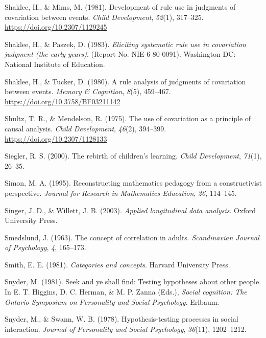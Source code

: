 \documentclass[11pt]{umnthesis}
\newlength{\cslhangindent}
\newenvironment{CSLReferences}[2] %
 {%
  \setlength{\parindent}{0pt}
  \ifodd #1 \everypar{\setlength{\hangindent}{\cslhangindent}}\ignorespaces\fi
  \ifnum #2 > 0
  \setlength{\parskip}{#2\baselineskip}
  \fi
 }%
 {}
\begin{document}
\begin{CSLReferences}{1}{0}
\leavevmode{}%
Shaklee, H., \& Mims, M. (1981). Development of rule use in judgments of covariation between events. \emph{Child Development}, \emph{52}(1), 317--325. \url{https://doi.org/10.2307/1129245}

\leavevmode{}%
Shaklee, H., \& Paszek, D. (1983). \emph{Eliciting systematic rule use in covariation judgment (the early years)}. (Report No. NIE-6-80-0091). Washington DC: National Institute of Education.

\leavevmode{}%
Shaklee, H., \& Tucker, D. (1980). A rule analysis of judgments of covariation between events. \emph{Memory \& Cognition}, \emph{8}(5), 459--467. \url{https://doi.org/10.3758/BF03211142}

\leavevmode{}%
Shultz, T. R., \& Mendelson, R. (1975). The use of covariation as a principle of causal analysis. \emph{Child Development}, \emph{46}(2), 394--399. \url{https://doi.org/10.2307/1128133}

\leavevmode{}%
Siegler, R. S. (2000). The rebirth of children's learning. \emph{Child Development}, \emph{71}(1), 26--35.

\leavevmode{}%
Simon, M. A. (1995). Reconstructing mathematics pedagogy from a constructivist perspective. \emph{Journal for Research in Mathematics Education}, \emph{26}, 114--145.

\leavevmode{}%
Singer, J. D., \& Willett, J. B. (2003). \emph{Applied longitudinal data analysis}. Oxford University Press.

\leavevmode{}%
Smedslund, J. (1963). The concept of correlation in adults. \emph{Scandinavian Journal of Psychology}, \emph{4}, 165--173.

\leavevmode{}%
Smith, E. E. (1981). \emph{Categories and concepts}. Harvard University Press.

\leavevmode{}%
Snyder, M. (1981). Seek and ye shall find: Testing hypotheses about other people. In E. T. Higgins, D. C. Herman, \& M. P. Zanna (Eds.), \emph{Social cognition: The {Ontario Symposium on Personality and Social Psychology}}. Erlbaum.

\leavevmode{}%
Snyder, M., \& Swann, W. B. (1978). Hypothesis\mbox{-}testing processes in social interaction. \emph{Journal of Personality and Social Psychology}, \emph{36}(11), 1202--1212.


\end{CSLReferences}
\end{document}
